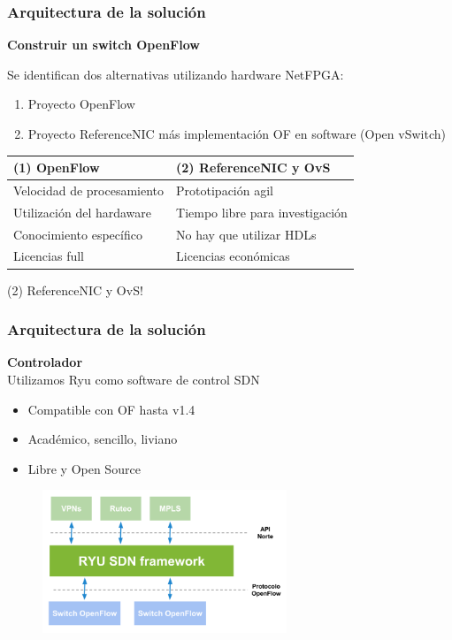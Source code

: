 \documentclass{beamer}
\begin{document}
\begin{frame}
\frametitle{Arquitectura de la soluci\'on} 

\textbf{Construir un switch OpenFlow} 

\vspace{0.3cm}
Se identifican dos alternativas utilizando hardware NetFPGA:
\pause 
\begin{enumerate}
\item Proyecto OpenFlow
\pause
\item Proyecto ReferenceNIC m\'as implementaci\'on OF en software (Open vSwitch)
\end{enumerate}

\pause
\begin{table}[]
\small
\centering
\label{label}
\begin{tabular}{| p{5cm} | p{5cm} |}

\hline
\multicolumn{1}{|l|}{(1) OpenFlow } & \multicolumn{1}{l|}{(2) ReferenceNIC y OvS } \\
\hline
Velocidad de procesamiento & Prototipaci\'on agil \\
Utilizaci\'on del hardaware &  Tiempo libre para investigaci\'on \\
Conocimiento espec\'ifico &  No hay que utilizar HDLs \\
Licencias full &  Licencias econ\'omicas \\

\hline  
\end{tabular}
\end{table}

\pause
{\color{blue} (2) ReferenceNIC y OvS!}

\end{frame}

\begin{frame}
\frametitle{Arquitectura de la soluci\'on} 

\textbf{Controlador} \\
Utilizamos Ryu como software de control SDN

\begin{itemize}
\item Compatible con OF hasta v1.4
\item Acad\'emico, sencillo, liviano
\item Libre y Open Source
\end{itemize}

\begin{figure}[H]
\centering
\includegraphics[width=0.65\textwidth]{imagenes/ryuarch.png}
\end{figure}

\end{frame}
\end{document}
